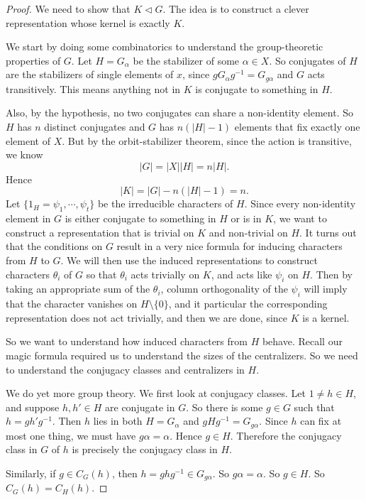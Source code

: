 \documentclass[a4paper]{article}
\begin{document}
\begin{proof}
  We need to show that $K \lhd G$. The idea is to construct a clever representation whose kernel is exactly $K$.

  We start by doing some combinatorics to understand the group-theoretic properties of $G$. Let $H = G_\alpha$ be the stabilizer of some $\alpha \in X$. So conjugates of $H$ are the stabilizers of single elements of $x$, since $g G_\alpha g^{-1} = G_{g\alpha}$ and $G$ acts transitively. This means anything not in $K$ is conjugate to something in $H$.

  Also, by the hypothesis, no two conjugates can share a non-identity element. So $H$ has $n$ distinct conjugates and $G$ has $n(|H| - 1)$ elements that fix exactly one element of $X$. But by the orbit-stabilizer theorem, since the action is transitive, we know
  \[
    |G| = |X| |H| = n|H|.
  \]
  Hence
  \[
    |K| = |G| - n(|H| - 1) = n.
  \]
  Let $\{1_H = \psi_1, \cdots, \psi_t\}$ be the irreducible characters of $H$. Since every non-identity element in $G$ is either conjugate to something in $H$ or is in $K$, we want to construct a representation that is trivial on $K$ and non-trivial on $H$. It turns out that the conditions on $G$ result in a very nice formula for inducing characters from $H$ to $G$. We will then use the induced representations to construct characters $\theta_i$ of $G$ so that $\theta_i$ acts trivially on $K$, and acts like $\psi_i$ on $H$. Then by taking an appropriate sum of the $\theta_i$, column orthogonality of the $\psi_i$ will imply that the character vanishes on $H \setminus \{0\}$, and it particular the corresponding representation does not act trivially, and then we are done, since $K$ is a kernel.

  So we want to understand how induced characters from $H$ behave. Recall our magic formula required us to understand the sizes of the centralizers. So we need to understand the conjugacy classes and centralizers in $H$.

  We do yet more group theory. We first look at conjugacy classes. Let $1 \not= h \in H$, and suppose $h, h' \in H$ are conjugate in $G$. So there is some $g \in G$ such that $h = g h' g^{-1}$. Then $h$ lies in both $H = G_\alpha$ and $gHg^{-1} = G_{g\alpha}$. Since $h$ can fix at most one thing, we must have $g\alpha = \alpha$. Hence $g \in H$. Therefore the conjugacy class in $G$ of $h$ is precisely the conjugacy class in $H$.

  Similarly, if $g \in C_G(h)$, then $h = ghg^{-1} \in G_{g\alpha}$. So $g\alpha = \alpha$. So $g \in H$. So $C_G(h) = C_H(h)$.


\end{proof}
\end{document}
